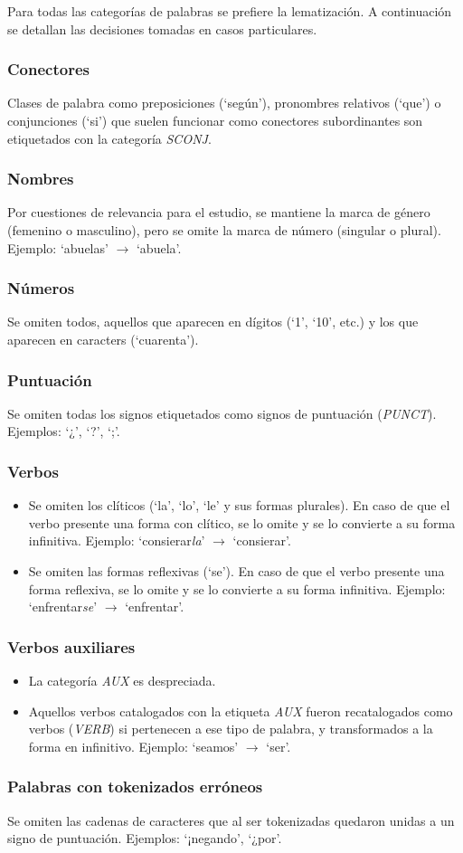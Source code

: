 Para todas las categorías de palabras se prefiere la lematización. A continuación
se detallan las decisiones tomadas en casos particulares.

\subsubsection{Conectores}
Clases de palabra como preposiciones (`según'), pronombres relativos (`que') o
conjunciones (`si') que suelen funcionar como conectores subordinantes son
etiquetados con la categoría \textit{SCONJ}.

\subsubsection{Nombres}
Por cuestiones de relevancia para el estudio, se mantiene la marca de género (femenino
o masculino), pero se omite la marca de número (singular o plural). Ejemplo: `abuelas'
$\rightarrow$ `abuela'.

\subsubsection{Números}
Se omiten todos, aquellos que aparecen en dígitos (`1', `10', etc.) y los que aparecen
en caracters (`cuarenta').

\subsubsection{Puntuación}
Se omiten todas los signos etiquetados como signos de puntuación (\textit{PUNCT}).
Ejemplos: `¿', `?', `;'.

\subsubsection{Verbos}
\begin{itemize}
    \item Se omiten los clíticos (`la', `lo', `le' y sus formas plurales). En caso de
    que el verbo presente una forma con clítico, se lo omite y se lo convierte a su
    forma infinitiva. Ejemplo: `consierar\textit{la}' $\rightarrow$ `consierar'.
    \item Se omiten las formas reflexivas (`se'). En caso de que el verbo presente
    una forma reflexiva, se lo omite y se lo convierte a su forma infinitiva.
    Ejemplo: `enfrentar\textit{se}' $\rightarrow$ `enfrentar'.
\end{itemize}

\subsubsection{Verbos auxiliares}
\begin{itemize}
    \item La categoría \textit{AUX} es despreciada.
    \item Aquellos verbos catalogados con la etiqueta \textit{AUX} fueron
    recatalogados como verbos (\textit{VERB}) si pertenecen a ese tipo de
    palabra, y transformados a la forma en infinitivo. Ejemplo: `seamos' $\rightarrow$ `ser'.
\end{itemize}

\subsubsection{Palabras con tokenizados erróneos}
Se omiten las cadenas de caracteres que al ser tokenizadas quedaron unidas a un
signo de puntuación. Ejemplos: `¡negando', `¿por'.
